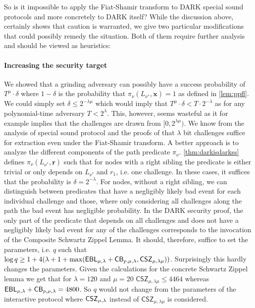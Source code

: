 So is it impossible to apply the Fiat-Shamir transform to DARK special sound protocols and more concretely to DARK itself? While the discussion above, certainly shows that caution is warranted, we give two particular modifications that could possibly remedy the situation. Both of them require further analysis and should be viewed as heuristics:

\paragraph{Increasing the security target}
We showed that a grinding adversary can possibly have a success probability of $T^\mu \cdot \delta$ where $1-\delta$ is the probability that $\pi_\nu(L_{\nu^*}, \mathbf{x})=1$ as defined in \cref{lem:ppfl}. We could simply set $\delta\leq 2^{-\lambda \mu}$ which would imply that $T^{\mu}\cdot \delta <T \cdot 2^{-\lambda}$ as for any polynomial-time adversary $T<2^\lambda$. This, however, seems wasteful as it for example implies that the challenges are drawn from $[0,2^{\lambda \mu})$. We know from the analysis of special sound protocol and the proofs of \cite{Attema,Wigstroem} that $\lambda$ bit challenges suffice for extraction even under the Fiat-Shamir transform. A better approach is to analyze the different components of the path predicate $\pi_\nu$. \cref{thm:darkisdarkss} defines
 $\pi_\nu(L_{\nu^*}, \mathbf{r})$ such that for nodes with a right sibling the predicate is either trivial or only depends on $L_{\nu^*}$ and $r_1$, i.e. one challenge. In these cases, it suffices that the probability is $\delta=2^{-\lambda}$. For nodes, without a right sibling, we can distinguish between predicates that have a negligibly likely bad event for each individual challenge and those, where only considering all challenges along the path the bad event has negligible probability. In the DARK security proof, the only part of the predicate that depends on all challenges and does not have a negligibly likely bad event for any of the challenges corresponds to the invocation of the Composite Schwartz Zippel Lemma. It should, therefore, suffice to set the parameters, i.e. $q$ such that $\log q \geq 1 + 4(\lambda + 1 + \max(\mathsf{EBL}_{\mu,\lambda}+ \mathsf{CB}_{p,\mu,\lambda}, \mathsf{CSZ}_{\mu,\lambda \mu} ))$. 
Surprisingly this hardly changes the parameters. Given the calculations for the concrete Schwartz Zippel lemma we get that for $\lambda=120$ and $\mu=20$ $\mathsf{CSZ}_{\mu,\lambda \mu}\leq 4464$ whereas $\mathsf{EBL}_{\mu,\lambda}+\mathsf{CB}_{p,\mu,\lambda}=4800$. So $q$ would not change from the parameters of the interactive protocol where $\mathsf{CSZ}_{\mu,\lambda}$ instead of $\mathsf{CSZ}_{\mu,\lambda \mu}$ is considered.  

